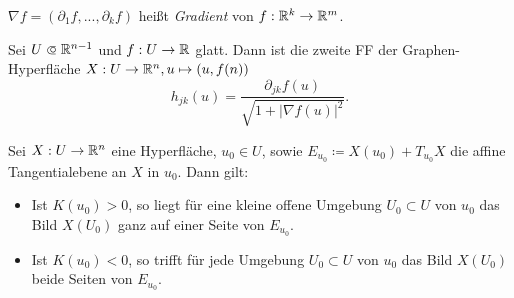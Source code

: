 \documentclass{cheat-sheet}
\newcommand\opn{\mathrel{\ooalign{$\subset$\cr
  \hidewidth\raise.1ex\hbox{$\circ\mkern.5mu$}\cr}}}
\begin{document}
\begin{nota}
  $\nabla f = (\partial_1 f, ..., \partial_k f)$ heißt \emph{Gradient} von $f : \mathbb{R}^k \to \mathbb{R}^m$.
\end{nota}

\begin{satz}
  Sei $U \opn \R^{n-1}$ und $f : U \to \mathbb{R}$ glatt. Dann ist die zweite FF der Graphen-Hyperfläche $X : U \to \mathbb{R}^n, u \mapsto (u, f(n))$
  \[ h_{jk}(u) = \frac{\partial_{jk} f(u)}{\sqrt{1 + |\nabla f(u)|^2}}. \]
\end{satz}

\begin{satz}
  Sei $X : U \to \mathbb{R}^n$ eine Hyperfläche, $u_0 \in U$, sowie $E_{u_0} \coloneqq X(u_0) + T_{u_0} X$ die affine Tangentialebene an $X$ in $u_0$. Dann gilt:
  \begin{itemize}
    \item Ist $K(u_0) > 0$, so liegt für eine kleine offene Umgebung $U_0 \subset U$ von $u_0$ das Bild $X(U_0)$ ganz auf einer Seite von $E_{u_0}$.
    \item Ist $K(u_0) < 0$, so trifft für jede Umgebung $U_0 \subset U$ von $u_0$ das Bild $X(U_0)$ beide Seiten von $E_{u_0}$.
  \end{itemize}
\end{satz}
\end{document}
